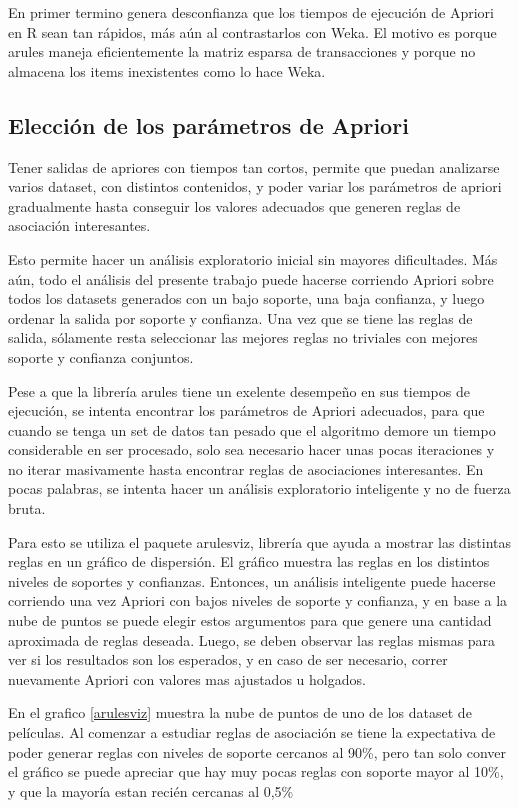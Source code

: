\documentclass[journal]{IEEEtran}
\begin{document}
En primer termino genera desconfianza  que los tiempos de ejecución de Apriori en R 
sean tan rápidos,
más aún al contrastarlos con Weka. 
El motivo es porque arules maneja eficientemente la matriz esparsa de transacciones y
porque no almacena los items inexistentes como lo hace Weka.


\subsection{Elección de los parámetros de Apriori}

Tener salidas de apriores con tiempos tan cortos, permite que puedan analizarse 
varios dataset, con distintos contenidos, y poder variar los parámetros de apriori gradualmente
hasta conseguir los valores adecuados que generen reglas de asociación interesantes.

Esto permite hacer un análisis exploratorio inicial sin mayores dificultades. Más aún, todo el 
análisis del presente trabajo puede hacerse corriendo Apriori sobre todos los datasets generados
con un bajo soporte, una baja confianza, y luego ordenar la salida por soporte y confianza.
Una vez que se tiene las reglas de salida, sólamente resta seleccionar las mejores reglas 
no triviales con mejores soporte y confianza conjuntos.

Pese a que la librería arules tiene un exelente desempeño en sus tiempos de ejecución, se intenta
encontrar los parámetros de Apriori adecuados, para que cuando se tenga un set de datos tan pesado
que el algoritmo demore un tiempo considerable en ser procesado, 
solo sea necesario hacer unas pocas iteraciones y
no iterar masivamente hasta encontrar reglas de asociaciones interesantes. En pocas palabras,
se intenta hacer un análisis exploratorio inteligente y no de fuerza bruta.

Para esto se utiliza el paquete arulesviz, librería que ayuda a mostrar las 
distintas reglas en un gráfico de dispersión. El gráfico muestra las reglas
en los distintos niveles de soportes y confianzas. Entonces, un análisis inteligente
puede hacerse corriendo una vez Apriori con bajos niveles de soporte y confianza, y 
en base a la nube de puntos se puede elegir estos argumentos para que genere 
una  cantidad aproximada de reglas deseada. Luego, se deben observar las reglas mismas para ver
si los resultados son los esperados, y en caso de ser necesario, correr nuevamente
Apriori con valores mas ajustados u holgados.

En el grafico \ref{arulesviz} muestra la nube de puntos de uno de los dataset de películas.
Al comenzar a estudiar reglas de asociación se tiene la expectativa de poder generar
reglas con niveles de soporte cercanos al 90\%, pero tan solo conver el gráfico
se puede apreciar que hay muy pocas reglas con soporte mayor al 10\%, y que la mayoría
estan recién cercanas al 0,5\%
\end{document}
